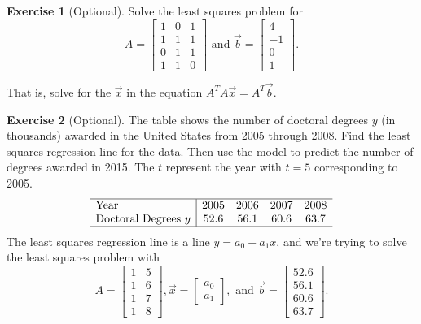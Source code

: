 \documentclass{beamer}
\newcommand{\fn}{\insertframenumber}
\theoremstyle{definition}
\newtheorem{exercise}{Exercise}
\begin{document}
\begin{frame}{\fn}
	\begin{exercise}[Optional]
		Solve the least squares problem for \[A=\begin{bmatrix}1&0&1\\1&1&1\\0&1&1\\1&1&0\end{bmatrix}\text{ and }\vec b=\begin{bmatrix}4\\-1\\0\\1\end{bmatrix}.\]
		
		That is, solve for the $\vec x$ in the equation $A^TA\vec x=A^T\vec b$.
	\end{exercise}
\end{frame}
\begin{frame}{\fn}
	\begin{exercise}[Optional]
		The table shows the number of doctoral degrees $y$ (in thousands) awarded in the United States from 2005 through 2008.  Find the least squares regression line for the data.  Then use the model to predict the number of degrees awarded in 2015.  The $t$ represent the year with $t=5$ corresponding to 2005.
		$$\begin{array}{l|cccc}
		\hline
		\text{Year}&2005&2006&2007&2008\\
		\text{Doctoral Degrees }y&52.6&56.1&60.6&63.7\\
		\hline
		\end{array}$$
		The least squares regression line is a line $y=a_0+a_1 x$, and we're trying to solve the least squares problem with
		\[A=\begin{bmatrix}1&5\\1&6\\1&7\\1&8\end{bmatrix}, \vec x=\begin{bmatrix}a_0\\a_1\end{bmatrix},\text{ and }\vec b=\begin{bmatrix}52.6\\56.1\\60.6\\63.7\end{bmatrix}.\]
	\end{exercise}
\end{frame}
\end{document}

